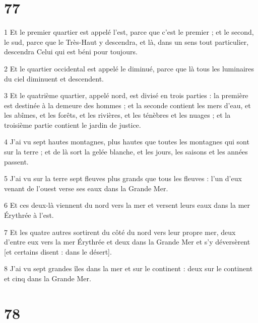 \chapter{77}

\par 1 Et le premier quartier est appelé l'est, parce que c'est le premier ; et le second, le sud, parce que le Très-Haut y descendra, et là, dans un sens tout particulier, descendra Celui qui est béni pour toujours.
\par 2 Et le quartier occidental est appelé le diminué, parce que là tous les luminaires du ciel diminuent et descendent.
\par 3 Et le quatrième quartier, appelé nord, est divisé en trois parties : la première est destinée à la demeure des hommes ; et la seconde contient les mers d'eau, et les abîmes, et les forêts, et les rivières, et les ténèbres et les nuages ​​; et la troisième partie contient le jardin de justice.
\par 4 J'ai vu sept hautes montagnes, plus hautes que toutes les montagnes qui sont sur la terre ; et de là sort la gelée blanche, et les jours, les saisons et les années passent.
\par 5 J'ai vu sur la terre sept fleuves plus grands que tous les fleuves : l'un d'eux venant de l'ouest verse ses eaux dans la Grande Mer.
\par 6 Et ces deux-là viennent du nord vers la mer et versent leurs eaux dans la mer Érythrée à l'est.
\par 7 Et les quatre autres sortirent du côté du nord vers leur propre mer, deux d'entre eux vers la mer Érythrée et deux dans la Grande Mer et s'y déversèrent [et certains disent : dans le désert].
\par 8 J'ai vu sept grandes îles dans la mer et sur le continent : deux sur le continent et cinq dans la Grande Mer.

\chapter{78}

